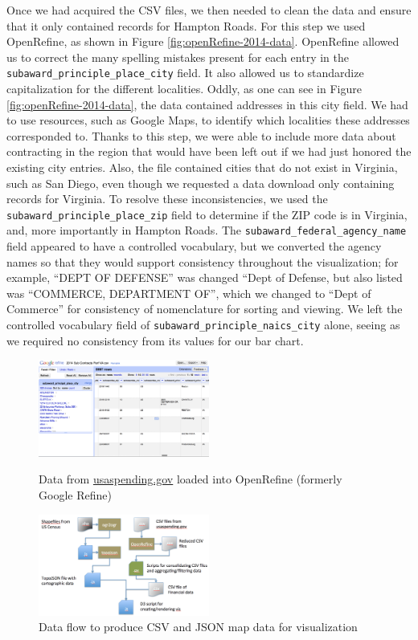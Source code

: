 \documentclass[10pt,journal,compsoc]{IEEEtran}
\begin{document}
Once we had acquired the CSV files, we then needed to clean the data and ensure that it only contained records for Hampton Roads.  For this step we used OpenRefine\cite{openrefine}, as shown in Figure \ref{fig:openRefine-2014-data}.  OpenRefine allowed us to correct the many spelling mistakes present for each entry in the {\tt subaward\_principle\_place\_city} field.  It also allowed us to standardize capitalization for the different localities.  Oddly, as one can see in Figure \ref{fig:openRefine-2014-data}, the data contained addresses in this city field.  We had to use resources, such as Google Maps, to identify which localities these addresses corresponded to.  Thanks to this step, we were able to include more data about contracting in the region that would have been left out if we had just honored the existing city entries.  Also, the file contained cities that do not exist in Virginia, such as San Diego, even though we requested a data download only containing records for Virginia.  To resolve these inconsistencies, we used the {\tt subaward\_principle\_place\_zip} field to determine if the ZIP code is in Virginia, and, more importantly in Hampton Roads.  The {\tt subaward\_federal\_agency\_name} field appeared to have a controlled vocabulary, but we converted the agency names so that they would support consistency throughout the visualization; for example, ``DEPT OF DEFENSE'' was changed ``Dept of Defense, but also listed was ``COMMERCE, DEPARTMENT OF'', which we changed to ``Dept of Commerce'' for consistency of nomenclature for sorting and viewing.  We left the controlled vocabulary field of {\tt subaward\_principle\_naics\_city} alone, seeing as we required no consistency from its values for our bar chart.

\begin{figure}[htbp]
	\centering
	\includegraphics[width=0.5\textwidth]{images/openRefine-2014-data.png}
	\caption{Data from \protect\url{usaspending.gov} loaded into OpenRefine (formerly Google Refine)}
	\label{fig:openRefine-2014-data}	

	\vspace{3em}

	\centering
	\includegraphics[width=0.5\textwidth]{images/data-flow.png}
	\caption{Data flow to produce CSV and JSON map data for visualization}
	\label{fig:data-flow}	
\end{figure}
\end{document}
